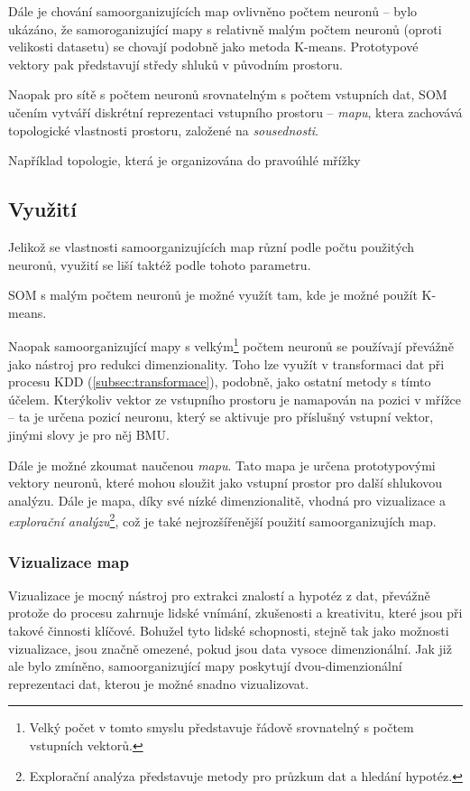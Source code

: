 \documentclass[thesis=M,czech]{FITthesis}[2012/06/26]
\begin{document}
Dále je chování samoorganizujících map ovlivněno počtem neuronů -- bylo ukázáno, že samoroganizující mapy s relativně malým počtem neuronů (oproti velikosti datasetu) se chovají podobně jako metoda K-means\cite{needed}. Prototypové vektory pak  představují středy shluků v původním prostoru.

Naopak pro sítě s počtem neuronů srovnatelným s počtem vstupních dat, SOM učením vytváří diskrétní reprezentaci vstupního prostoru -- \textit{mapu}, ktera zachovává topologické vlastnosti prostoru, založené na \textit{sousednosti}\cite{cluster_som}.


Například topologie, která je organizována do pravoúhlé mřížky



\subsection{Využití}

Jelikož se vlastnosti samoorganizujících map různí podle počtu použitých neuronů, využití se liší taktéž podle tohoto parametru.

SOM s malým počtem neuronů je možné využít tam, kde je možné použít K-means\cite{needed}.


Naopak samoorganizující mapy s velkým\footnote{Velký počet v tomto smyslu představuje řádově srovnatelný s počtem vstupních vektorů.} počtem neuronů se používají převážně jako nástroj pro redukci dimenzionality.  Toho lze využít v transformaci dat při procesu KDD (\ref{subsec:transformace}), podobně, jako ostatní metody s tímto účelem\cite{som_dim_red}. Kterýkoliv vektor ze vstupního prostoru je namapován na pozici v mřížce -- ta je určena pozicí neuronu, který se aktivuje pro příslušný vstupní vektor, jinými slovy je pro něj BMU.


Dále je možné zkoumat naučenou \textit{mapu}. Tato mapa je určena prototypovými vektory neuronů, které mohou sloužit jako vstupní prostor pro další shlukovou analýzu\cite{som_clustering}. Dále je mapa, díky své nízké dimenzionalitě, vhodná pro vizualizace a 
\textit{explorační analýzu}\footnote{Explorační analýza představuje metody pro průzkum dat a hledání hypotéz.}, což je také nejrozšířenější použití samoorganizujích map.



\subsubsection*{Vizualizace map}
Vizualizace je mocný nástroj pro extrakci znalostí a hypotéz z dat, převážně protože do procesu zahrnuje lidské vnímání, zkušenosti a kreativitu, které jsou při takové činnosti klíčové\cite{visual}. Bohužel tyto lidské schopnosti, stejně tak jako možnosti vizualizace, jsou značně omezené, pokud jsou data vysoce dimenzionální. Jak již ale bylo zmíněno, samoorganizující mapy poskytují dvou-dimenzionální reprezentaci dat, kterou je možné snadno vizualizovat.
\end{document}
